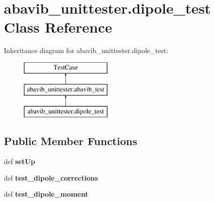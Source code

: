 \hypertarget{classabavib__unittester_1_1dipole__test}{\section{abavib\+\_\+unittester.\+dipole\+\_\+test Class Reference}
\label{classabavib__unittester_1_1dipole__test}
}
Inheritance diagram for abavib\+\_\+unittester.\+dipole\+\_\+test\+:\begin{figure}[H]
\begin{center}
\leavevmode
\includegraphics[height=3.000000cm]{classabavib__unittester_1_1dipole__test}
\end{center}
\end{figure}
\subsection*{Public Member Functions}
\begin{DoxyCompactItemize}
\item 
\hypertarget{classabavib__unittester_1_1dipole__test_a2c0f8a11c4637598a2da41f6d8239981}{def {\bfseries set\+Up}}\label{classabavib__unittester_1_1dipole__test_a2c0f8a11c4637598a2da41f6d8239981}

\item 
\hypertarget{classabavib__unittester_1_1dipole__test_a8be7710eb8af478ce6484e7030cf3309}{def {\bfseries test\+\_\+dipole\+\_\+corrections}}\label{classabavib__unittester_1_1dipole__test_a8be7710eb8af478ce6484e7030cf3309}

\item 
\hypertarget{classabavib__unittester_1_1dipole__test_a49bd584afe5ab540c023fd941f56eef2}{def {\bfseries test\+\_\+dipole\+\_\+moment}}\label{classabavib__unittester_1_1dipole__test_a49bd584afe5ab540c023fd941f56eef2}

\end{DoxyCompactItemize}
